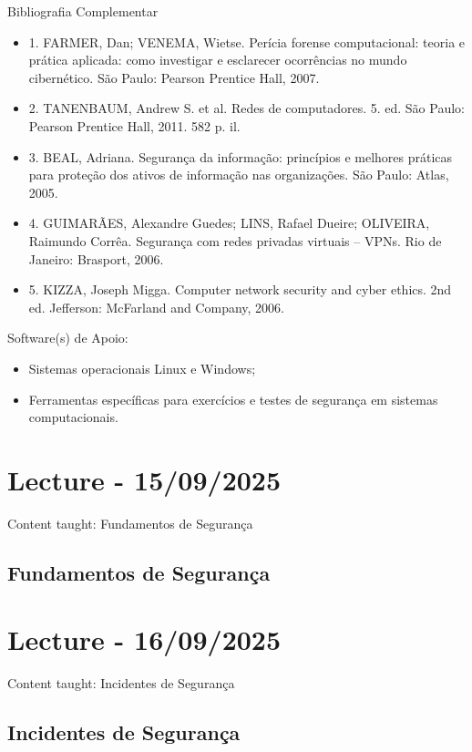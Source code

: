 \documentclass{article}
\begin{document}
\begin{center}
Bibliografia Complementar
\end{center}
\begin{itemize}
      \item 1. FARMER, Dan; VENEMA, Wietse. Perícia forense computacional: teoria e prática aplicada: como investigar e esclarecer ocorrências no mundo cibernético. São Paulo: Pearson Prentice Hall, 2007.
      \item 2. TANENBAUM, Andrew S. et al. Redes de computadores. 5. ed. São Paulo: Pearson Prentice Hall, 2011. 582 p. il.
      \item 3. BEAL, Adriana. Segurança da informação: princípios e melhores práticas para proteção dos ativos de informação nas organizações. São Paulo: Atlas, 2005.
      \item 4. GUIMARÃES, Alexandre Guedes; LINS, Rafael Dueire; OLIVEIRA, Raimundo Corrêa. Segurança com redes privadas virtuais – VPNs. Rio de Janeiro: Brasport, 2006.
      \item 5. KIZZA, Joseph Migga. Computer network security and cyber ethics. 2nd ed. Jefferson: McFarland and Company, 2006.      
\end{itemize}

\begin{center}
Software(s) de Apoio:
\end{center}
\begin{itemize}
      \item Sistemas operacionais Linux e Windows;
      \item Ferramentas específicas para exercícios e testes de segurança em sistemas computacionais.
\end{itemize}

\section{Lecture - 15/09/2025}
Content taught: Fundamentos de Segurança
\subsection{Fundamentos de Segurança}

\section{Lecture - 16/09/2025}
Content taught: Incidentes de Segurança
\subsection{Incidentes de Segurança}
\end{document}

